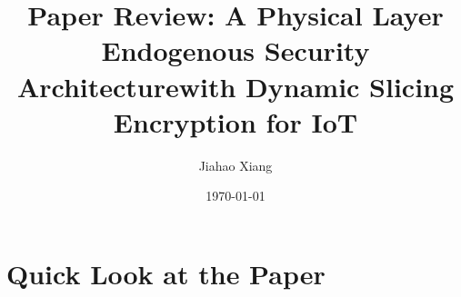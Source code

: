 \documentclass[a4paper]{article}
\title{Paper Review: A Physical Layer Endogenous Security Architecturewith Dynamic Slicing Encryption for IoT}
\author{Jiahao Xiang}
\date{\today}
\begin{document}
\maketitle

\section{Quick Look at the Paper}

% 
\end{document}
